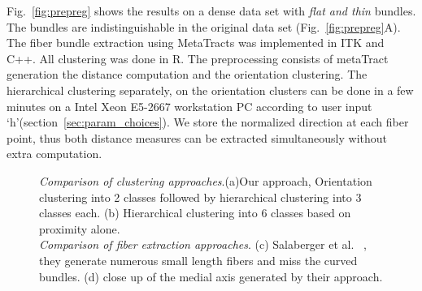 Fig.~\ref{fig:prepreg} shows the results on a dense data set with \textit{flat and thin} bundles. The bundles are indistinguishable in the original data set (Fig.~\ref{fig:prepreg}A).
The fiber bundle extraction using MetaTracts was implemented in ITK and C++. All clustering was done in R. The preprocessing consists of metaTract generation the distance computation and the orientation clustering. The hierarchical clustering separately,  on the orientation clusters can be done in a few minutes on a Intel Xeon E5-2667 workstation PC according to user input `h'(section~\ref{sec:param_choices}). We store the normalized direction at each fiber point, thus both distance measures can be extracted simultaneously without extra computation.



\begin{figure}[h]
\centering
{}


   \caption{\textit{Comparison of clustering approaches}.(a)Our approach,  Orientation clustering into 2 classes followed by hierarchical clustering into 3 classes each. (b) Hierarchical clustering into 6 classes based on proximity alone.\\
   \textit{Comparison of fiber extraction approaches}. (c) Salaberger et al. ~\cite{Salaberger2011}, they generate numerous small length fibers and miss the curved bundles. (d) close up of the medial axis generated by their approach.}\label{fig:compare-2}
\end{figure}


